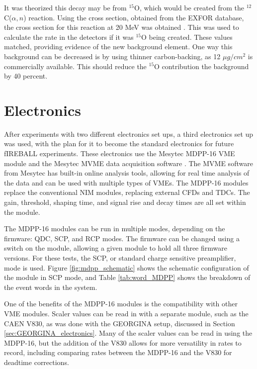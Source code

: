 



It was theorized this decay may be from $^{15}$O, which would be created from the $^{12}$C($\alpha,n$) reaction. Using the cross section, obtained from the EXFOR database, the cross section for this reaction at 20 MeV was obtained \citep{zerkin18:_exfor,black69:_carbonalphan}. This was used to calculate the rate in the detectors if it was $^{15}$O being created. These values matched, providing evidence of the new background element. One way this background can be decreased is by using thinner carbon-backing, as 12 $\mu g/cm^2$ is commercially available. This should reduce the $^{15}$O contribution the background by 40 percent.

\section{Electronics}

After experiments with two different electronics set ups, a third electronics set up was used, with the plan for it to become the standard electronics for future fIREBALL experiments. These electronics use the Mesytec MDPP-16 VME module and the Mesytec MVME data acquisition software \citep{mesytec:_mdpp,mesytec:_mvme}. The MVME software from Mesytec has built-in online analysis tools, allowing for real time analysis of the data and can be used with multiple types of VMEs. The MDPP-16 modules replace the conventional NIM modules, replacing external CFDs and TDCs. The gain, threshold, shaping time, and signal rise and decay times are all set within the module. 

The MDPP-16 modules can be run in multiple modes, depending on the firmware: QDC, SCP, and RCP modes. The firmware can be changed using a switch on the module, allowing a given module to hold all three firmware versions. For these tests, the SCP, or standard charge sensitive preamplifier, mode is used. Figure \ref{fig:mdpp_schematic} shows the schematic configuration of the module in SCP mode, and Table \ref{tab:word_MDPP} shows the breakdown of the event words in the system.



One of the benefits of the MDPP-16 modules is the compatibility with other VME modules. Scaler values can be read in with a separate module, such as the CAEN V830, as was done with the GEORGINA setup, discussed in Section \ref{sec:GEORGINA_electronics}. Many of the scaler values can be read in using the MDPP-16, but the addition of the V830 allows for more versatility in rates to record, including comparing rates between the MDPP-16 and the V830 for deadtime corrections.

